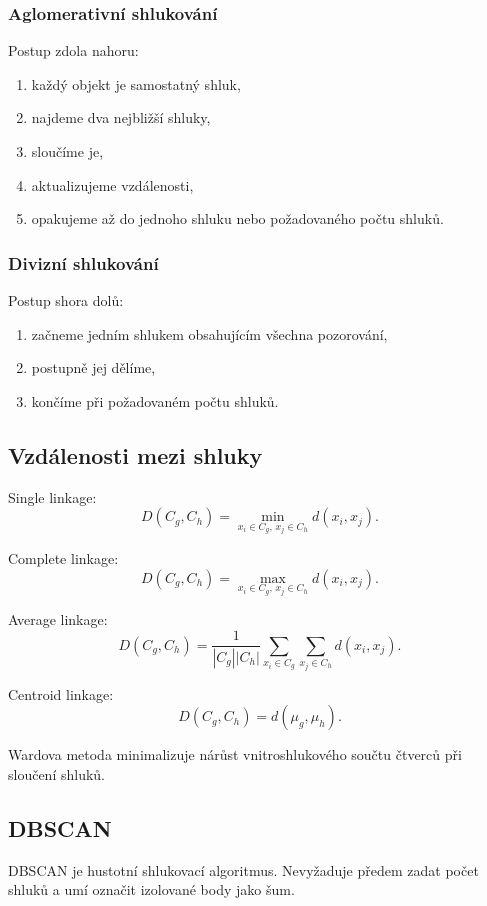 \subsubsection{Aglomerativní shlukování}

Postup zdola nahoru:
\begin{enumerate}
    \item každý objekt je samostatný shluk,
    \item najdeme dva nejbližší shluky,
    \item sloučíme je,
    \item aktualizujeme vzdálenosti,
    \item opakujeme až do jednoho shluku nebo požadovaného počtu shluků.
\end{enumerate}

\subsubsection{Divizní shlukování}

Postup shora dolů:
\begin{enumerate}
    \item začneme jedním shlukem obsahujícím všechna pozorování,
    \item postupně jej dělíme,
    \item končíme při požadovaném počtu shluků.
\end{enumerate}

\subsection{Vzdálenosti mezi shluky}

Single linkage:
\[
D(C_g,C_h)
=
\min_{x_i\in C_g,\,x_j\in C_h}
d(x_i,x_j).
\]

Complete linkage:
\[
D(C_g,C_h)
=
\max_{x_i\in C_g,\,x_j\in C_h}
d(x_i,x_j).
\]

Average linkage:
\[
D(C_g,C_h)
=
\frac{1}{|C_g||C_h|}
\sum_{x_i\in C_g}
\sum_{x_j\in C_h}
d(x_i,x_j).
\]

Centroid linkage:
\[
D(C_g,C_h)=d(\mu_g,\mu_h).
\]

Wardova metoda minimalizuje nárůst vnitroshlukového součtu čtverců při sloučení shluků.

\subsection{DBSCAN}

DBSCAN je hustotní shlukovací algoritmus. Nevyžaduje předem zadat počet shluků a umí označit izolované body
jako šum.

